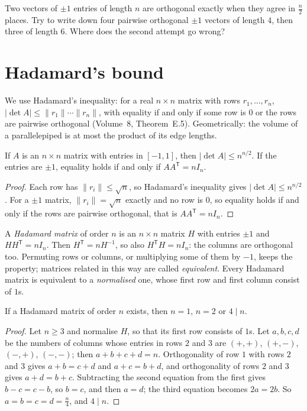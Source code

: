 \begin{think}
Two vectors of $\pm1$ entries of length $n$ are orthogonal exactly when they agree in $\frac n2$ places. Try to write down four pairwise orthogonal
$\pm1$ vectors of length $4$, then three of length $6$. Where does the second attempt go wrong?
\end{think}

\section{Hadamard's bound}

We use Hadamard's inequality: for a real $n\times n$ matrix with rows $r_1,\dots,r_n$, $|\det A|\le\|r_1\|\cdots\|r_n\|$, with equality if and only if
some row is $0$ or the rows are pairwise orthogonal (Volume~8, Theorem~E.5). Geometrically: the volume of a parallelepiped is at most the product of its
edge lengths.

\begin{theorem}[Hadamard, 1893]\label{conjectures:thm:hadbound}
If $A$ is an $n\times n$ matrix with entries in $[-1,1]$, then $|\det A|\le n^{n/2}$. If the entries are $\pm1$, equality holds if and only if
$AA^{\mathsf T}=nI_n$.
\end{theorem}
\begin{proof}
Each row has $\|r_i\|\le\sqrt n$, so Hadamard's inequality gives $|\det A|\le n^{n/2}$. For a $\pm1$ matrix, $\|r_i\|=\sqrt n$ exactly and no row is $0$,
so equality holds if and only if the rows are pairwise orthogonal, that is $AA^{\mathsf T}=nI_n$.
\end{proof}

A \emph{Hadamard matrix} of order $n$ is an $n\times n$ matrix $H$ with entries $\pm1$ and $HH^{\mathsf T}=nI_n$. Then $H^{\mathsf T}=nH^{-1}$, so also
$H^{\mathsf T}H=nI_n$: the columns are orthogonal too. Permuting rows or columns, or multiplying some of them by $-1$, keeps the property; matrices related
in this way are called \emph{equivalent}. Every Hadamard matrix is equivalent to a \emph{normalised} one, whose first row and first column consist of $1$s.

\begin{proposition}\label{conjectures:prop:div4}
If a Hadamard matrix of order $n$ exists, then $n=1$, $n=2$ or $4\mid n$.
\end{proposition}
\begin{proof}
Let $n\ge3$ and normalise $H$, so that its first row consists of $1$s. Let $a,b,c,d$ be the numbers of columns whose entries in rows $2$ and $3$ are
$(+,+)$, $(+,-)$, $(-,+)$, $(-,-)$; then $a+b+c+d=n$. Orthogonality of row $1$ with rows $2$ and $3$ gives $a+b=c+d$ and $a+c=b+d$, and orthogonality
of rows $2$ and $3$ gives $a+d=b+c$. Subtracting the second equation from the first gives $b-c=c-b$, so $b=c$, and then $a=d$; the third equation
becomes $2a=2b$. So $a=b=c=d=\frac n4$, and $4\mid n$.
\end{proof}

